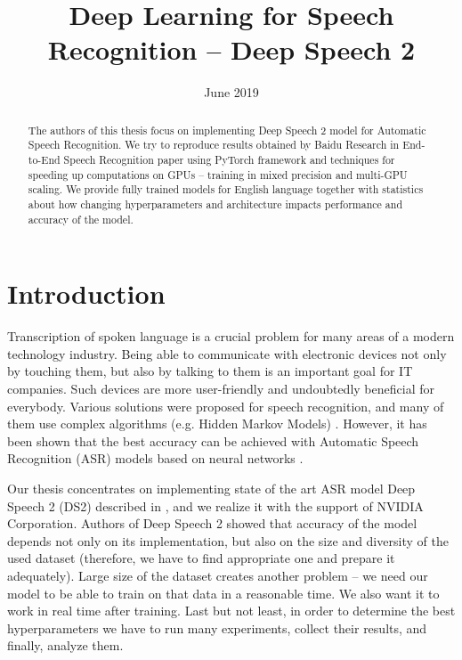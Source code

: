 \documentclass[licencjacka,en]{pracamgr}
\title{Deep Learning for Speech Recognition -- Deep Speech 2}
\date{June 2019}
\begin{document}
	\maketitle
	
	\begin{abstract}
		The authors of this thesis focus on implementing Deep Speech 2 model for Automatic Speech Recognition. We try to reproduce results obtained by Baidu Research in End-to-End Speech Recognition paper \cite{DS2} using PyTorch framework and techniques for speeding up computations on GPUs -- training in mixed precision and multi-GPU scaling. We provide fully trained models for English language together with statistics about how changing hyperparameters and architecture impacts performance and accuracy of the model.
	\end{abstract}
	
	\tableofcontents
	
	\chapter*{Introduction}
	Transcription of spoken language is a crucial problem for many areas of a modern technology industry. Being able to communicate with electronic devices not only by touching them, but also by talking to them is an important goal for IT companies. Such devices are more user-friendly and undoubtedly beneficial for everybody. Various solutions were proposed for speech recognition, and many of them use complex algorithms (e.g. Hidden Markov Models) \cite{DS1}. However, it has been shown that the best accuracy can be achieved with Automatic Speech Recognition (ASR) models based on neural networks \cite{DS2}.
	
	Our thesis concentrates on implementing state of the art ASR model Deep Speech 2 (DS2) described in \cite{DS2}, and we realize it with the support of NVIDIA Corporation. Authors of Deep Speech 2 showed that accuracy of the model depends not only on its implementation, but also on the size and diversity of the used dataset (therefore, we have to find appropriate one and prepare it adequately). Large size of the dataset creates another problem -- we need our model to be able to train on that data in a reasonable time. We also want it to work in real time after training. Last but not least, in order to determine the best hyperparameters we have to run many experiments, collect their results, and finally, analyze them.
	
\end{document}
